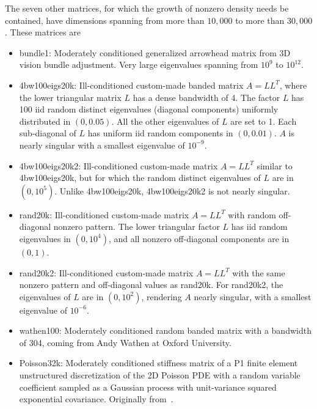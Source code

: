 \documentclass[numbers,webpdf,imanum]{ima-authoring-template}%
\theoremstyle{thmstyletwo}%
\numberwithin{equation}{section}
\begin{document}
The seven other matrices, for which the growth of nonzero density needs be contained, have dimensions spanning from more than $10{,}000$ to more than $30{,}000$.
These matrices are
\begin{itemize}
\item[-] bundle1: Moderately conditioned generalized arrowhead matrix from 3D vision bundle adjustment.
Very large eigenvalues spanning from $10^9$ to $10^{12}$.
\item[-] 4bw100eigs20k: Ill-conditioned custom-made banded matrix $A=LL^T$, where the lower triangular matrix $L$ has a dense bandwidth of 4.
The factor $L$ has 100 iid random distinct eigenvalues (diagonal components) uniformly distributed in $(0,0.05)$.
All the other eigenvalues of $L$ are set to 1.
Each sub-diagonal of $L$ has uniform iid random components in $(0,0.01)$.
$A$ is nearly singular with a smallest eigenvalue of $10^{-9}$.
\item[-] 4bw100eigs20k2: Ill-conditioned custom-made matrix $A=LL^T$ similar to 4bw100eigs20k, but for which the random distinct eigenvalues of $L$ are in $(0,10^5)$.
Unlike 4bw100eigs20k, 4bw100eigs20k2 is not nearly singular.
\item[-] rand20k: Ill-conditioned custom-made matrix $A=LL^T$ with random off-diagonal nonzero pattern. 
The lower triangular factor $L$ has iid random eigenvalues in $(0,10^4)$, and all nonzero off-diagonal components are in $(0,1)$.
\item[-] rand20k2: Ill-conditioned custom-made matrix $A=LL^T$ with the same nonzero pattern and off-diagonal values as rand20k.
For rand20k2, the eigenvalues of $L$ are in $(0,10^2)$, rendering $A$ nearly singular, with a smallest eigenvalue of $10^{-6}$.
\item[-] wathen100: Moderately conditioned random banded matrix with a bandwidth of 304, coming from Andy Wathen at Oxford University.
\item[-] Poisson32k:
Moderately conditioned stiffness matrix of a P1 finite element unstructured discretization of the 2D Poisson PDE with a random variable coefficient sampled as a Gaussian process with unit-variance squared exponential covariance.
Originally from~\cite{venkovic2023preconditioning}.
\end{itemize}
\end{document}
